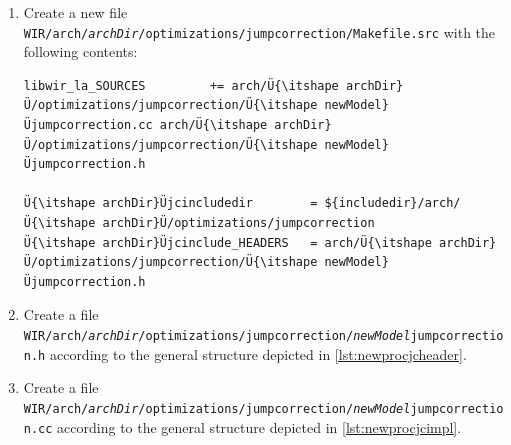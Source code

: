 \begin{enumerate}
\begin{lstlisting}[style=code,float=!t,caption={Header File for a New Processor Model's Jump Correction},label=lst:newprocjcheader]
}       // namespace WIR

^#endif^
\end{lstlisting}

\begin{lstlisting}[style=code,float=!t,caption={Rudimentary Implementation of a New Processor Model's Jump Correction},label=lst:newprocjcimpl]
^ifdef HAVE_CONFIG_H^
^#include^ §<config_wir.h>§
^#endif^

// Include WIR headers
^#include^ §<wir/wir.h>§
^#include^ §<analyses/liveness/wirlivenessanalysis.h>§Ü\label{lst:newprocjcimpl1}Ü
^#include^ §<arch/Ü{\itshape\color{orange}archDir}Ü/Ü{\itshape\color{orange}newModel}Ü.h>§

// Include local headers
^#include^ §"Ü{\itshape\color{orange}newModel}Üjumpcorrection.h"§

namespace WIR {

// Default constructor for system-level optimization.
Ü{\itshape newModel}Ü_JumpCorrection::Ü{\itshape newModel}Ü_JumpCorrection@(@ WIR_System æ&æs @) :@Ü\label{lst:newprocjcimpl2}Ü
  WIR_JumpCorrection { s }
{};

// Destructor.
Ü{\itshape newModel}Ü_JumpCorrection::~Ü{\itshape newModel}Ü_JumpCorrection@( void )@Ü\label{lst:newprocjcimpl3}Ü
{};

}       // namespace WIR
\end{lstlisting}

  \item Create a new file \texttt{WIR/arch/{\itshape archDir}/optimizations/jumpcorrection/Makefile.src} with the following contents: \\
\begin{lstlisting}[style=code,float=!ht,xleftmargin=10mm,aboveskip=-0.8 \baselineskip,belowskip=-0.8 \baselineskip]
libwir_la_SOURCES         += arch/Ü{\itshape archDir}Ü/optimizations/jumpcorrection/Ü{\itshape newModel}Üjumpcorrection.cc arch/Ü{\itshape archDir}Ü/optimizations/jumpcorrection/Ü{\itshape newModel}Üjumpcorrection.h

Ü{\itshape archDir}Üjcincludedir        = ${includedir}/arch/Ü{\itshape archDir}Ü/optimizations/jumpcorrection
Ü{\itshape archDir}Üjcinclude_HEADERS   = arch/Ü{\itshape archDir}Ü/optimizations/jumpcorrection/Ü{\itshape newModel}Üjumpcorrection.h
\end{lstlisting}

  \item Create a file \texttt{WIR/arch/{\itshape archDir}/optimizations/jumpcorrection/{\itshape newModel}jumpcorrection.h} according to the general structure depicted in \cref{lst:newprocjcheader}.

  \item Create a file \texttt{WIR/arch/{\itshape archDir}/optimizations/jumpcorrection/{\itshape newModel}jumpcorrection.cc} \linebreak according to the general structure depicted in \cref{lst:newprocjcimpl}.
\end{enumerate}

